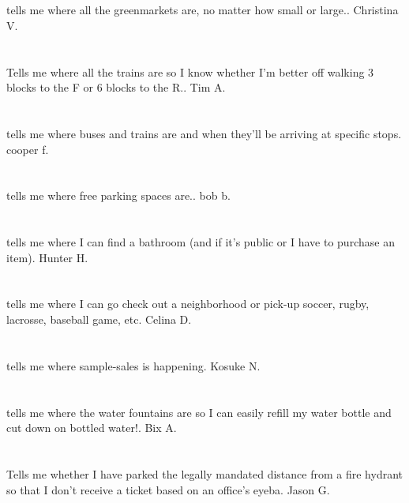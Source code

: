\section{}tells me where all the greenmarkets are,  no matter how small or large.. Christina  V.
\section{}Tells me where all the trains are so I know whether I'm better off walking 3 blocks to the F or 6 blocks to the R.. Tim A.
\section{}tells me where buses and trains are and when they'll be arriving at specific stops. cooper f.
\section{}tells me where free parking spaces are.. bob b.
\section{}tells me where I can   find a bathroom (and if it's public or I have to purchase an item). Hunter H.
\section{}tells me where I can go check out a neighborhood or pick-up soccer,  rugby,  lacrosse,  baseball game,  etc. Celina D.
\section{}tells me where sample-sales is happening. Kosuke N.
\section{}tells me where the water fountains are so I can easily refill my water bottle and cut down on bottled water!. Bix A.
\section{}Tells me whether I have parked the legally mandated distance from a fire hydrant so that I don't receive a ticket based on an office's eyeba. Jason G.
